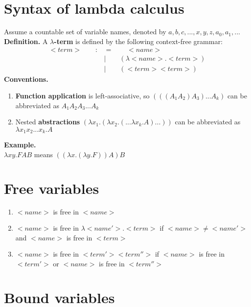 \documentclass{article}
\begin{document}
\section{Syntax of lambda calculus}
Assume a countable set of variable names, denoted by $a, b, c, ..., x, y, z, a_0, a_1, ...$\medskip
\\\textbf{Definition.} A \textbf{$\lambda$-term} is defined by the following context-free grammar:
\begin{align*}
<term>\qquad:&=\qquad <name>\\
 & |\qquad(\lambda <name> . <term>)\\
& |\qquad(<term><term>)
\end{align*}
\textbf{Conventions.}
\begin{enumerate}
	\item \textbf{Function application} is left-associative, so $(((A_1A_2)A_3)...A_k)$ can be abbreviated as $A_1A_2A_3...A_k$
	\item Nested \textbf{abstractions} $(\lambda x_1.(\lambda x_2.(...\lambda x_k. A)...))$ can be abbreviated as $\lambda x_1x_2...x_k.A$
\end{enumerate}
\textbf{Example.}
\\ $\lambda x y.F A B$ means $((\lambda x.(\lambda y.F)) A) B$

\section{Free variables}
\begin{enumerate}
	\item $<name>$ is free in $<name>$
	\item $<name>$ is free in $\lambda<name'>.<term>$ if $<name>\neq<name'>$ and $<name>$ is free in $<term>$
	\item $<name>$ is free in $<term'><term''>$ if $<name>$ is free in $<term'>$ or $<name>$ is free in $<term''>$
\end{enumerate}

\section{Bound variables}
\end{document}
